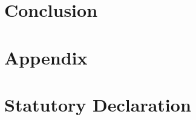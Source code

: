 \documentclass[11pt, a4paper]{article} %
\begin{document}
\section{Conclusion}

\blindtext %

\newpage %

%



\newpage %
\section*{Appendix} %

\blindtext %

\newpage %
\thispagestyle{empty} %
\section*{Statutory Declaration} %
\end{document}

